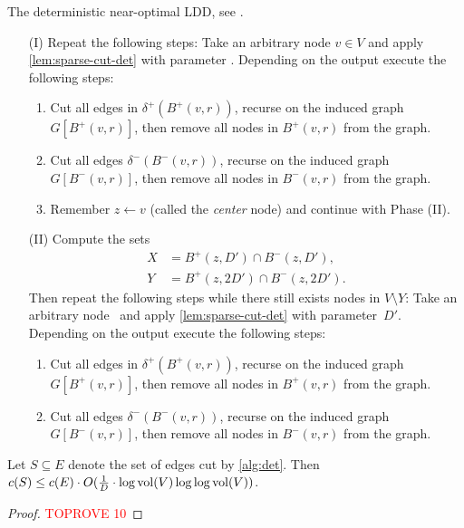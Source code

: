 \documentclass[letterpaper,11pt]{article}
\begin{document}
\begin{algorithm}[t]
	\caption{The deterministic near-optimal LDD, see .} \label{alg:det}
	\begin{enumerate}[label=\arabic*.]
		\item[(I)] Repeat the following steps: Take an arbitrary node $v \in V$ and apply \cref{lem:sparse-cut-det} with parameter . Depending on the output execute the following steps:
		\begin{enumerate}[label=(\roman*)]
			\item Cut all edges in $\delta^+(B^+(v, r))$, recurse on the induced graph $G[B^+(v, r)]$, then remove all nodes in $B^+(v, r)$ from the graph.
			\item Cut all edges $\delta^-(B^-(v, r))$, recurse on the induced graph $G[B^-(v, r)]$, then remove all nodes in $B^-(v, r)$ from the graph.
			\item Remember $z \gets v$ (called the \emph{center} node) and continue with Phase (II).
		\end{enumerate}
		\item[(II)] Compute the sets
		\begin{align*}
			X &= B^+(z, D') \cap B^-(z, D'), \\
			Y &= B^+(z, 2D') \cap B^-(z, 2D').
		\end{align*}
		Then repeat the following steps while there still exists nodes in $V \setminus Y$: Take an arbitrary node~ and apply \cref{lem:sparse-cut-det} with parameter~$D'$. Depending on the output execute the following steps:
		\begin{enumerate}[label=(\roman*)]
			\item Cut all edges in $\delta^+(B^+(v, r))$, recurse on the induced graph $G[B^+(v, r)]$, then remove all nodes in $B^+(v, r)$ from the graph.
			\item Cut all edges $\delta^-(B^-(v, r))$, recurse on the induced graph $G[B^-(v, r)]$, then remove all nodes in $B^-(v, r)$ from the graph.
		\end{enumerate}
	\end{enumerate}
\end{algorithm}

\begin{lemma} \label{lem:ldd-det-cost}
Let $S \subseteq E$ denote the set of edges cut by \cref{alg:det}. Then $c(S) \leq c(E) \cdot O(\frac{1}{D} \cdot \log \operatorname{vol}(V) \log\log \operatorname{vol}(V))$.
\end{lemma}
\begin{proof}\textcolor{red}{TOPROVE 10}\end{proof}
\end{document}
